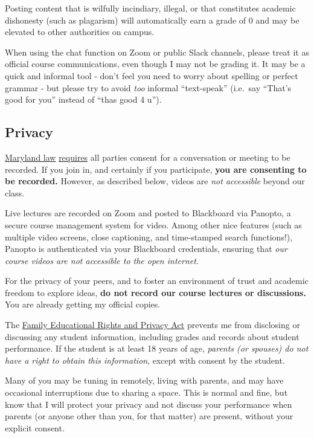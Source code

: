 \documentclass{article}
\begin{document}
Posting content that is wilfully incindiary, illegal, or that
constitutes academic dishonesty (such as plagarism) will automatically
earn a grade of 0 and may be elevated to other authorities on campus.

When using the chat function on Zoom or public Slack channels, please
treat it as official course communications, even though I may not be
grading it. It may be a quick and informal tool - don't feel you need to
worry about spelling or perfect grammar - but please try to avoid
\emph{too} informal ``text-speak'' (i.e.~say ``That's good for you''
instead of ``thas good 4 u'').

\hypertarget{privacy}{%
\subsection{Privacy}\label{privacy}}

\href{https://www.execvision.io/blog/maryland-call-recording-laws/}{Maryland
law}
\href{https://law.justia.com/codes/maryland/2005/gcj/10-402.html}{requires}
all parties consent for a conversation or meeting to be recorded. If you
join in, and certainly if you participate, \textbf{you are consenting to
be recorded.} However, as described below, videos are \emph{not
accessible} beyond our class.

Live lectures are recorded on Zoom and posted to Blackboard via Panopto,
a secure course management system for video. Among other nice features
(such as multiple video screens, close captioning, and time-stamped
search functions!), Panopto is authenticated via your Blackboard
credentials, ensuring that \emph{our course videos are not accessible to
the open internet.}

For the privacy of your peers, and to foster an environment of trust and
academic freedom to explore ideas, \textbf{do not record our course
lectures or discussions.} You are already getting my official copies.

The
\href{https://www2.ed.gov/policy/gen/guid/fpco/ferpa/index.html}{Family
Educational Rights and Privacy Act} prevents me from disclosing or
discussing any student information, including grades and records about
student performance. If the student is at least 18 years of age,
\emph{parents (or spouses) do not have a right to obtain this
information}, except with consent by the student.

Many of you may be tuning in remotely, living with parents, and may have
occasional interruptions due to sharing a space. This is normal and
fine, but know that I will protect your privacy and not discuss your
performance when parents (or anyone other than you, for that matter) are
present, without your explicit consent.
\end{document}
